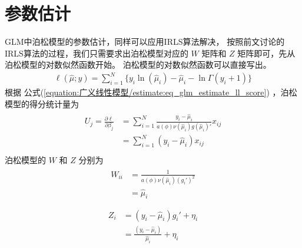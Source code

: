 \documentclass[letterpaper,10pt,english]{sphinxmanual}
\begin{document}
\section{参数估计}
\label{\detokenize{_u6cca_u677e_u6a21_u578b/content:id6}}
GLM中泊松模型的参数估计，同样可以应用IRLS算法解决，
按照前文讨论的IRLS算法的过程，我们只需要求出泊松模型对应的 \(W\) 矩阵和
\(Z\) 矩阵即可，先从泊松模型的对数似然函数开始。
泊松模型的对数似然函数可以直接写出。
\begin{equation}\label{equation:泊松模型/content:泊松模型/content:9}
\begin{split}\ell(\hat{\mu};y) = \sum_{i=1}^N \{
y_i \ln(\hat{\mu}_i) -\hat{\mu}_i-\ln \Gamma(y_i+1)
\}\end{split}
\end{equation}
根据 公式(\ref{equation:广义线性模型/estimate:eq_glm_estimate_ll_score})
，泊松模型的得分统计量为
\begin{align}\label{equation:泊松模型/content:泊松模型/content:10}\!\begin{aligned}
U_j = \frac{\partial \ell}{\partial \beta_j}
&= \sum_{i=1}^N \frac{y_i-\hat{\mu}_i}{a(\phi) \nu(\hat{\mu}_i) g(\hat{\mu}_i)' }  x_{ij}\\
&=  \sum_{i=1}^N (y_i-\hat{\mu}_i) x_{ij}\\
\end{aligned}\end{align}
泊松模型的 \(W\) 和 \(Z\) 分别为
\begin{align}\label{equation:泊松模型/content:泊松模型/content:11}\!\begin{aligned}
W_{ii} &=  \frac{ 1}{ a(\phi) \nu(\hat{\mu}_i) ( g_i' )^2}\\
&=   \hat{\mu}_i\\
\end{aligned}\end{align}\begin{align}\label{equation:泊松模型/content:泊松模型/content:12}\!\begin{aligned}
Z_i &=  (y_i- \hat{\mu}_i) g_i'  + \eta_i\\
&=   \frac{(y_i- \hat{\mu}_i)}{ \hat{\mu}_i}  + \eta_i\\
\end{aligned}\end{align}
\end{document}
